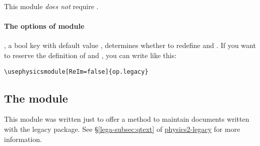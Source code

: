\documentclass[11pt,letterpaper]{article}
\begin{document}
This module \emph{does not} require .

\paragraph{The options of  module}
, a bool key with default value , determines whether to
redefine  and . If you want to reserve the definition of
 and , you can write like this:
\begin{Verbatim}
\usephysicsmodule[ReIm=false]{op.legacy}
\end{Verbatim}

\subsection{The  module}
This module was written just to offer a method to maintain documents written
with the legacy  package. See \S\ref*{lega-subsec:qtext} of
\hyperref{./physics2-legacy.pdf}{}{}{physics2-legacy} for more information.
\end{document}
